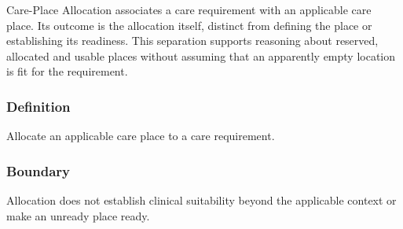 Care-Place Allocation associates a care requirement with an applicable care place. Its outcome is the allocation itself, distinct from defining the place or establishing its readiness. This separation supports reasoning about reserved, allocated and usable places without assuming that an apparently empty location is fit for the requirement.

\subsubsection*{Definition}

Allocate an applicable care place to a care requirement.

\subsubsection*{Boundary}

Allocation does not establish clinical suitability beyond the applicable context or make an unready place ready.

